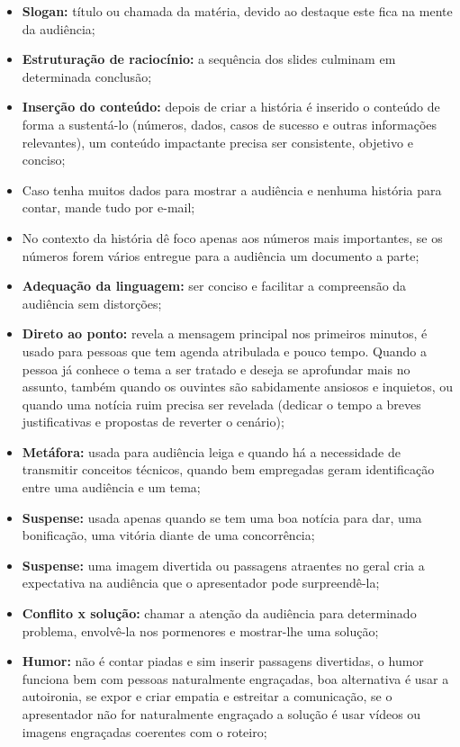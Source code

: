 \begin{itemize}
    \item \textbf{Slogan:} título ou chamada da matéria, devido ao destaque este fica na mente da audiência;
    \item \textbf{Estruturação de raciocínio:} a sequência dos slides culminam em determinada conclusão;
    \item \textbf{Inserção do conteúdo:} depois de criar a história é inserido o conteúdo de forma a sustentá-lo (números, dados, casos de sucesso e outras informações relevantes), um conteúdo impactante precisa ser consistente, objetivo e conciso;
    \item Caso tenha muitos dados para mostrar a audiência e nenhuma história para contar, mande tudo por e-mail;
    \item No contexto da história dê foco apenas aos números mais importantes, se os números forem vários entregue para a audiência um documento a parte;
    \item \textbf{Adequação da linguagem:} ser conciso e facilitar a compreensão da audiência sem distorções;
    \item \textbf{Direto ao ponto:} revela a mensagem principal nos primeiros minutos, é usado para pessoas que tem agenda atribulada e pouco tempo. Quando a pessoa já conhece o tema a ser tratado e deseja se aprofundar mais no assunto, também quando os ouvintes são sabidamente ansiosos e inquietos, ou quando uma notícia ruim precisa ser revelada (dedicar o tempo a breves justificativas e propostas de reverter o cenário);
    \item \textbf{Metáfora:} usada para audiência leiga e quando há a necessidade de transmitir conceitos técnicos, quando bem empregadas geram identificação entre uma audiência e um tema;
    \item \textbf{Suspense:} usada apenas quando se tem uma boa notícia para dar, uma bonificação, uma vitória diante de uma concorrência;
    \item \textbf{Suspense:} uma imagem divertida ou passagens atraentes no geral cria a expectativa na audiência que o apresentador pode surpreendê-la;
    \item \textbf{Conflito x solução:} chamar a atenção da audiência para determinado problema, envolvê-la nos pormenores e mostrar-lhe uma solução;
    \item \textbf{Humor:} não é contar piadas e sim inserir passagens divertidas, o humor funciona bem com pessoas naturalmente engraçadas, boa alternativa é usar a autoironia, se expor e criar empatia e estreitar a comunicação, se o apresentador não for naturalmente engraçado a solução é usar vídeos ou imagens engraçadas coerentes com o roteiro;

\end{itemize}
